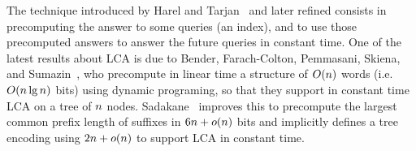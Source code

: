 \begin{LONG}
The technique introduced by Harel and
Tarjan~\cite{fastAlgorithmsForFindingNearestCommonAncestors} and later
refined consists in precomputing the answer to some queries (an
index), and to use those precomputed answers to answer the future
queries in constant time.
%
One of the latest results about LCA is due to Bender, Farach-Colton,
Pemmasani, Skiena, and
Sumazin~\cite{findingLeastCommonAncestorInDirectedAcyclicGraphs}, who
precompute in linear time a structure of $O(n)$ words (i.e.
$O(n\lg n)$ bits) using dynamic programing, so that they
support in constant time LCA on a tree of $n$ nodes.
%
Sadakane~\cite{succinctRepresentationsOfLCPInformationAndImprovementsInTheCompressedSuffixArrays}
improves this to precompute the largest common prefix length of
suffixes in $6n+o(n)$ bits and implicitly defines a tree
encoding using $2n+o(n)$ to support LCA in constant
time.
\end{LONG}



